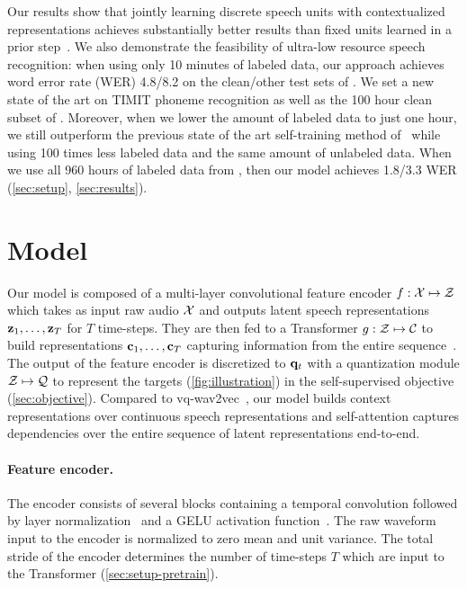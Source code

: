 \documentclass{article}
\begin{document}
Our results show that jointly learning discrete speech units with contextualized representations achieves substantially better results than fixed units learned in a prior step~\cite{baevski2019effectiveness}.
We also demonstrate the feasibility of ultra-low resource speech recognition: 
when using only 10 minutes of labeled data, our approach achieves word error rate (WER) 4.8/8.2 on the clean/other test sets of \libri{}.
We set a new state of the art on TIMIT phoneme recognition as well as the 100 hour clean subset of \libri{}. 
Moreover, when we lower the amount of labeled data to just one hour, we still outperform the previous state of the art self-training method of~\citep{park2020improved} while using 100 times less labeled data and the same amount of unlabeled data.
When we use all 960 hours of labeled data from \libri{}, then our model achieves 1.8/3.3 WER (\autoref{sec:setup}, \autoref{sec:results}).


\section{Model}
\label{sec:model}

Our model is composed of a multi-layer convolutional feature encoder $f: \mathcal{X} \mapsto \mathcal{Z}$ which takes as input raw audio $\mathcal{X}$ and outputs latent speech representations $\mathbf{z}_1, \dots, \mathbf{z}_T$ for $T$ time-steps. 
They are then fed to a Transformer $g: \mathcal{Z} \mapsto \mathcal{C}$ to build representations $\mathbf{c}_1, \dots, \mathbf{c}_T$ capturing  information from the entire sequence~\cite{devlin2018bert,baevski2019vqwav2vec,baevski2019effectiveness}.
The output of the feature encoder is discretized to $\mathbf{q}_t$ with a quantization module $\mathcal{Z} \mapsto \mathcal{Q}$ to represent the targets (\autoref{fig:illustration}) in the self-supervised objective (\autoref{sec:objective}).
Compared to vq-wav2vec~\citep{baevski2019vqwav2vec}, our model builds context representations over continuous speech representations and self-attention captures dependencies over the entire sequence of latent representations end-to-end.

\paragraph{Feature encoder.} 
The encoder consists of several blocks containing a temporal convolution followed by layer normalization~\citep{ba2016layer} and a GELU activation function~\citep{hendrycks2016gaussian}.
The raw waveform input to the encoder is normalized to zero mean and unit variance.
The total stride of the encoder determines the number of time-steps $T$ which are input to the Transformer (\autoref{sec:setup-pretrain}).
\end{document}
